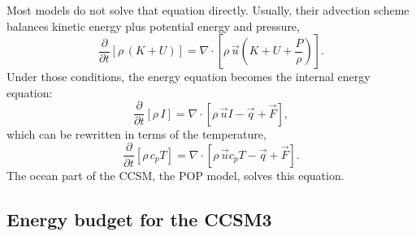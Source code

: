 Most models do not solve that equation directly. Usually, their advection scheme balances kinetic energy plus potential energy and pressure,
\begin{equation}\label{ener}
\frac{\partial}{\partial t} \left[ \rho \, (K+U) \right] = \nabla \cdot \left[{\rho \, \vec{u} (K+U+\frac{P}{\rho})} \right].
\end{equation}
Under those conditions, the energy equation becomes the internal energy equation:
\begin{equation}\label{internal}
\frac{\partial}{\partial t} \left[ \rho \, I \right] = \nabla \cdot \left[{\rho \, \vec{u} I - \vec{q} + \vec{F}} \right],
\end{equation}
which can be rewritten in terms of the temperature,
\begin{equation}\label{Tequ}
\frac{\partial}{\partial t} \left[ \rho \, c_{p} T \right] = \nabla \cdot \left[{\rho \, \vec{u} c_{p} T - \vec{q} + \vec{F}} \right].
\end{equation}
The ocean part of the CCSM, the POP model, solves this equation. 

\subsection{Energy budget for the CCSM3}\label{c3}

